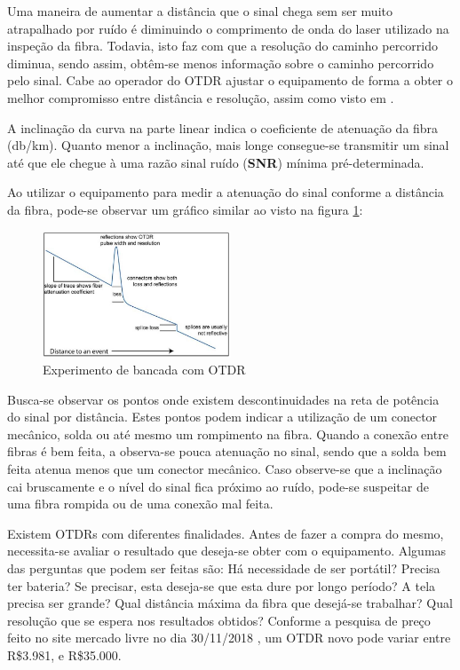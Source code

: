\documentclass[article]{IEEEtran}
\begin{document}
Uma maneira de aumentar a distância que o sinal chega sem ser muito atrapalhado por ruído é diminuindo o comprimento de onda do laser utilizado na inspeção da fibra. Todavia, isto faz com que a resolução do caminho percorrido diminua, sendo assim, obtêm-se menos informação sobre o caminho percorrido pelo sinal. Cabe ao operador do OTDR ajustar o equipamento de forma a obter o melhor compromisso entre distância e resolução, assim como visto em \cite{OTDR_LAB}.

A inclinação da curva na parte linear indica o coeficiente de atenuação da fibra (db/km). Quanto menor a inclinação, mais longe consegue-se transmitir um sinal até que ele chegue à uma razão sinal ruído (\textbf{SNR}) mínima pré-determinada.

Ao utilizar o equipamento para medir a atenuação do sinal conforme a distância da fibra, pode-se observar um gráfico similar ao visto na figura \ref{fig:OTDR_grafico}:
\begin{figure}[H]
	\includegraphics[width=0.5\textwidth]{images/OTDR_grafico.JPG}
	\caption{Experimento de bancada com OTDR}
	\label{fig:OTDR_grafico}
\end{figure} 

Busca-se observar os pontos onde existem descontinuidades na reta de potência do sinal por distância. Estes pontos podem indicar a utilização de um conector mecânico, solda ou até mesmo um rompimento na fibra. Quando a conexão entre fibras é bem feita, a observa-se pouca atenuação no sinal, sendo que a solda bem feita atenua menos que um conector mecânico. Caso observe-se que a inclinação cai bruscamente e o nível do sinal fica próximo ao ruído, pode-se suspeitar de uma fibra rompida ou de uma conexão mal feita.

Existem OTDRs com diferentes finalidades. Antes de fazer a compra do mesmo, necessita-se avaliar o resultado que deseja-se obter com o equipamento. Algumas das perguntas que podem ser feitas são: Há necessidade de ser portátil? Precisa ter bateria? Se precisar, esta deseja-se que esta dure por longo período? A tela precisa ser grande? Qual distância máxima da fibra que desejá-se trabalhar? Qual resolução que se espera nos resultados obtidos? Conforme a pesquisa de preço feito no site mercado livre no dia 30/11/2018 \cite{M_LIVRE}, um OTDR novo pode variar entre R\$3.981, e R\$35.000.
\end{document}
